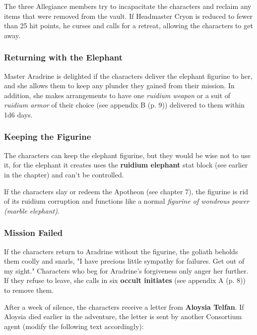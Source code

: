 \documentclass[letterpaper, 11pt, bg=full, twocolumn]{dndbook}
\begin{document}
The three Allegiance members try to incapacitate the characters and reclaim any items that were removed from the vault. If Headmaster Cryon is reduced to fewer than 25 hit points, he curses and calls for a retreat, allowing the characters to get away.


\subsubsection{Returning with the Elephant}

Master Aradrine is delighted if the characters deliver the elephant figurine to her, and she allows them to keep any plunder they gained from their mission. In addition, she makes arrangements to have one \textit{ruidium weapon} or a suit of \textit{ruidium armor} of their choice (see appendix B (p. 9)) delivered to them within 1d6 days.

\subsubsection{Keeping the Figurine}

The characters can keep the elephant figurine, but they would be wise not to use it, for the elephant it creates uses the \textbf{ruidium elephant} stat block (see earlier in the chapter) and can't be controlled.

If the characters slay or redeem the Apotheon (see chapter 7), the figurine is rid of its ruidium corruption and functions like a normal \textit{figurine of wondrous power (marble elephant)}.

\subsubsection{Mission Failed}

If the characters return to Aradrine without the figurine, the goliath beholds them coolly and snarls, "I have precious little sympathy for failures. Get out of my sight." Characters who beg for Aradrine's forgiveness only anger her further. If they refuse to leave, she calls in six \textbf{occult initiates} (see appendix A (p. 8)) to remove them.

After a week of silence, the characters receive a letter from \textbf{Aloysia Telfan}. If Aloysia died earlier in the adventure, the letter is sent by another Consortium agent (modify the following text accordingly):
\end{document}

